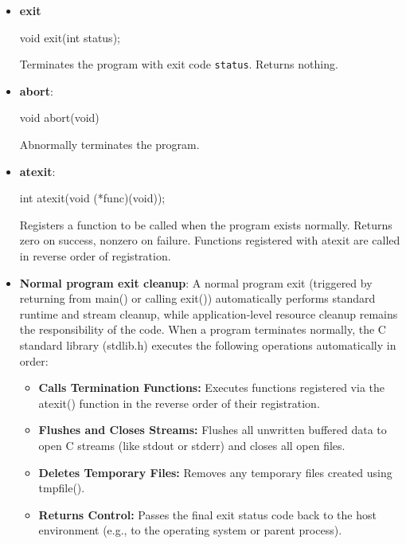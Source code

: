 \documentclass{report}
\begin{document}
    \begin{itemize}
        \item \textbf{exit} 
            \bigbreak \noindent 
            \begin{cppcode}
            void exit(int status); 
            \end{cppcode}
            \bigbreak \noindent 
            Terminates the program with exit code \texttt{status}. 
            \bigbreak \noindent 
            Returns nothing.
        \item \textbf{abort}: 
            \bigbreak \noindent 
            \begin{cppcode}
            void abort(void)
            \end{cppcode}
            \bigbreak \noindent 
            Abnormally terminates the program.
        \item \textbf{atexit}: 
            \bigbreak \noindent 
            \begin{cppcode}
            int atexit(void (*func)(void));
            \end{cppcode}
            \bigbreak \noindent 
            Registers a function to be called when the program exists normally.
            \bigbreak \noindent 
            Returns zero on success, nonzero on failure.
            \bigbreak \noindent 
            Functions registered with atexit are called in reverse order of registration.
        \item \textbf{Normal program exit cleanup}: A normal program exit (triggered by returning from main() or calling exit()) automatically performs standard runtime and stream cleanup, while application-level resource cleanup remains the responsibility of the code.
            \bigbreak \noindent 
            When a program terminates normally, the C standard library (stdlib.h) executes the following operations automatically in order: 
            \begin{itemize}
                \item \textbf{Calls Termination Functions:} Executes functions registered via the atexit() function in the reverse order of their registration.
                \item \textbf{Flushes and Closes Streams:} Flushes all unwritten buffered data to open C streams (like stdout or stderr) and closes all open files.
                \item \textbf{Deletes Temporary Files:} Removes any temporary files created using tmpfile().
                \item \textbf{Returns Control:} Passes the final exit status code back to the host environment (e.g., to the operating system or parent process). 

\end{itemize}
\end{itemize}
\end{document}
